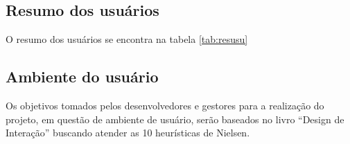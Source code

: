 \subsection{Resumo dos usuários}

O resumo dos usuários se encontra na tabela \ref{tab:resusu}

\begin{table}[H]
\centering
\caption{Resumo dos usuários}
\label{tab:resusu}
\end{table}


\subsection{Ambiente do usuário}
Os objetivos tomados pelos desenvolvedores e gestores para a realização do projeto, em questão de ambiente de usuário, serão baseados no livro “Design de Interação” \cite{rogers2013design} buscando atender as 10 heurísticas de Nielsen.

